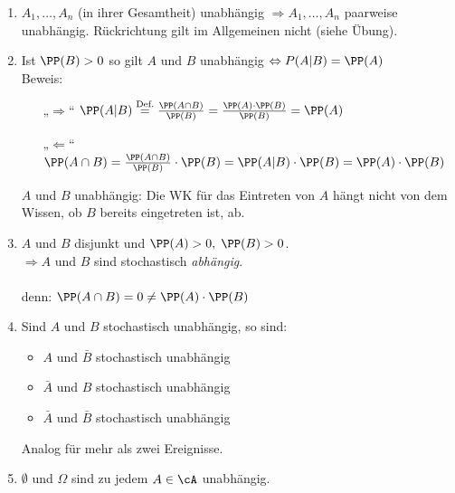 \documentclass{scrreprt}
\begin{document}
\begin{enumerate}
\item $A_1, \dots , A_n$ (in ihrer Gesamtheit) unabhängig $\Rightarrow A_1, \dots , A_n$ paarweise unabhängig. Rückrichtung gilt im Allgemeinen nicht (siehe Übung).
\item Ist $\PP(B) >0$ so gilt $A$ und $B$ unabhängig $\Leftrightarrow P(A|B) = \PP(A)$\\
Beweis:
\begin{itemize}
\item[„$\Rightarrow$“]
$\PP(A|B) \overset{\text{Def.}}{=}\frac{\PP(A\cap B)}{\PP(B)}=\frac{\PP(A) \cdot \PP(B)}{\PP(B)}=\PP(A)$
\item[„$\Leftarrow$“]
$\PP(A\cap B) = \frac{\PP(A \cap B)}{\PP(B)}\cdot \PP(B) = \PP(A|B) \cdot \PP(B) = \PP(A) \cdot \PP(B)$
\end{itemize}
$A$ und $B$ unabhängig: Die WK für das Eintreten von $A$ hängt nicht von dem Wissen, ob $B$ bereits eingetreten ist, ab.
\item $A$ und $B$ disjunkt und $\PP(A) > 0, \; \PP(B) >0$.\\
$\Rightarrow A$ und $B$ sind stochastisch \emph{abhängig}.\\
\\
denn: $\PP(A\cap B) = 0 \not = \PP(A) \cdot \PP(B)$
\item Sind $A$ und $B$ stochastisch unabhängig, so sind:
\begin{itemize}
\item $A$ und $\bar B$ stochastisch unabhängig
\item $\bar A$ und $B$ stochastisch unabhängig
\item $\bar A$ und $\bar B$ stochastisch unabhängig
\end{itemize}
Analog für mehr als zwei Ereignisse.
\item $\emptyset$ und $\Omega$ sind zu jedem $A \in \cA$ unabhängig.
\end{enumerate}
\end{document}

